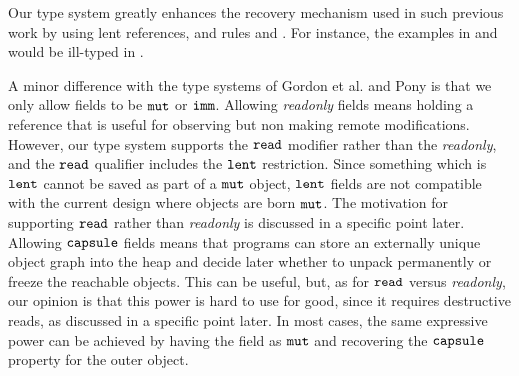 Our {type system greatly enhances the recovery mechanism used in such previous work \cite{GordonEtAl12,ClebschEtAl15} by using lent references, and rules  and .} For instance, the examples in  and  would be ill-typed in \cite{GordonEtAl12}. 

{A minor difference with the type systems of Gordon et al. \cite{GordonEtAl12} and Pony \cite{GordonEtAl12,ClebschEtAl15} is that we only allow fields to be $\texttt{mut}$ or $\texttt{imm}$.
Allowing \emph{readonly} fields means holding a reference that is useful for observing but non making remote modifications. However, our type system supports the $\texttt{read}$ modifier rather than the \emph{readonly}, and the $\texttt{read}$ qualifier includes the $\texttt{lent}$ restriction. Since something which is $\texttt{lent}$ cannot be saved as part of a $\texttt{mut}$ object, $\texttt{lent}$ fields are not compatible with the current design where objects are born $\texttt{mut}$. The motivation for supporting $\texttt{read}$ rather than \emph{readonly} is discussed in a specific point later.
Allowing $\texttt{capsule}$ fields means that programs can store an externally unique object graph into the heap and decide later whether to unpack
 permanently or freeze the reachable objects.  This can be useful, but, as for $\texttt{read}$ versus \emph{readonly}, our opinion is that this power is hard to use for good, since
it requires destructive reads, as discussed in a specific point later. 
In most cases, the same expressive power can be achieved by having the
field as $\texttt{mut}$ and recovering the $\texttt{capsule}$ property for the outer object.}

